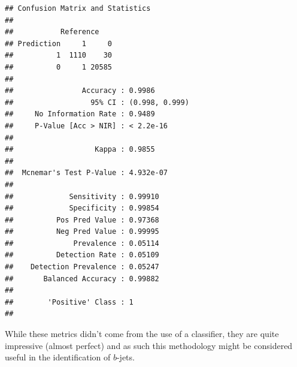 \documentclass[
]{article}
\begin{document}
\begin{verbatim}
## Confusion Matrix and Statistics
## 
##           Reference
## Prediction     1     0
##          1  1110    30
##          0     1 20585
##                                         
##                Accuracy : 0.9986        
##                  95% CI : (0.998, 0.999)
##     No Information Rate : 0.9489        
##     P-Value [Acc > NIR] : < 2.2e-16     
##                                         
##                   Kappa : 0.9855        
##                                         
##  Mcnemar's Test P-Value : 4.932e-07     
##                                         
##             Sensitivity : 0.99910       
##             Specificity : 0.99854       
##          Pos Pred Value : 0.97368       
##          Neg Pred Value : 0.99995       
##              Prevalence : 0.05114       
##          Detection Rate : 0.05109       
##    Detection Prevalence : 0.05247       
##       Balanced Accuracy : 0.99882       
##                                         
##        'Positive' Class : 1             
## 
\end{verbatim}

While these metrics didn't come from the use of a classifier, they are
quite impressive (almost perfect) and as such this methodology might be
considered useful in the identification of \(b\)-jets.
\end{document}
